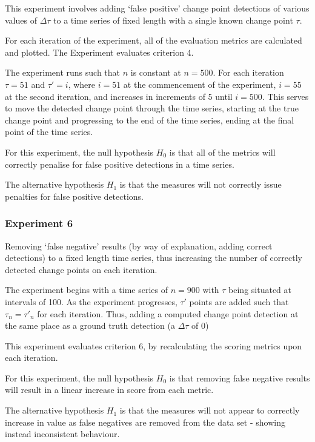 \documentclass{uvamscse}	%
\begin{document}
This experiment involves adding `false positive' change point detections of various values of $\Delta \tau$ to a time series of fixed length with a single known change point $\tau$.

For each iteration of the experiment, all of the evaluation metrics are calculated and plotted. The Experiment evaluates criterion 4.

The experiment runs such that $n$ is constant at $n=500$. For each iteration $\tau = 51$ and $\tau' = i$, where $i = 51$ at the commencement of the experiment, $i=55$ at the second iteration, and increases in increments of 5 until $i = 500$. This serves to move the detected change point through the time series, starting at the true change point and progressing to the end of the time series, ending at the final point of the time series.

For this experiment, the null hypothesis $H_0$ is that all of the metrics will correctly penalise for false positive detections in a time series.

The alternative hypothesis $H_1$ is that the measures will not correctly issue penalties for false positive detections.

\subsubsection{Experiment 6}

Removing `false negative' results (by way of explanation, adding correct detections) to a fixed length time series, thus increasing the number of correctly detected change points on each iteration.

The experiment begins with a time series of $n=900$ with $\tau$ being situated at intervals of 100. As the experiment progresses, $\tau'$ points are added such that $\tau_n = \tau'_n$ for each iteration. Thus, adding a computed change point detection at the same place as a ground truth detection (a $\Delta \tau$ of 0)

This experiment evaluates criterion 6, by recalculating the scoring metrics upon each iteration.

For this experiment, the null hypothesis $H_0$ is that removing false negative results will result in a linear increase in score from each metric.

The alternative hypothesis $H_1$ is that the measures will not appear to correctly increase in value as false negatives are removed from the data set - showing instead inconsistent behaviour.
\end{document}

